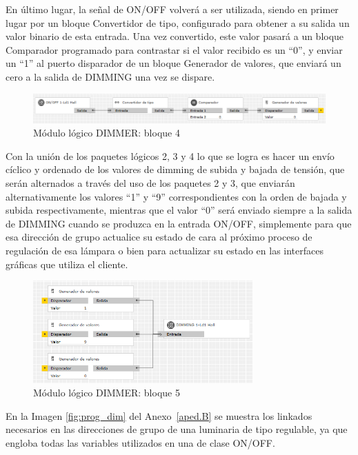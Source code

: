 En último lugar, la señal de ON/OFF volverá a ser utilizada, siendo en primer lugar por un bloque Convertidor de tipo, configurado para obtener a su salida un valor binario de esta entrada. Una vez convertido, este valor pasará a un bloque Comparador programado para  contrastar si el valor recibido es un “0”, y enviar un “1” al puerto disparador de un bloque Generador de valores, que enviará un cero a la salida de DIMMING una vez se dispare. 
\begin{figure}[H]
\centering
\includegraphics[width=1.08\textwidth]{figures/log_dimm_b4.png}   
\caption{Módulo lógico DIMMER: bloque 4}
\label{fig:log_dimm_b4}
\end{figure}
Con la unión de los paquetes lógicos 2, 3 y 4 lo que se logra es hacer un envío cíclico y ordenado de los valores de dimming de subida y bajada de tensión, que serán alternados a través del uso de los paquetes 2 y 3, que enviarán alternativamente los valores “1” y “9” correspondientes con la orden de bajada y subida respectivamente, mientras que el valor “0” será enviado siempre a la salida de DIMMING cuando se produzca en la entrada ON/OFF, simplemente para que esa dirección de grupo actualice su estado de cara al próximo proceso de regulación de esa lámpara o bien para actualizar su estado en las interfaces gráficas que utiliza el cliente.
\begin{figure}[H]
\centering
\includegraphics[width=0.75\textwidth]{figures/log_dimm_b5.png}   
\caption{Módulo lógico DIMMER: bloque 5}
\label{fig:log_dimm_b5}
\end{figure}
En la Imagen \ref{fig:prog_dim} del Anexo~\ref{aped.B} se muestra los linkados necesarios en las direcciones de grupo de una luminaria de tipo regulable, ya que engloba todas las variables utilizados en una de clase ON/OFF.

